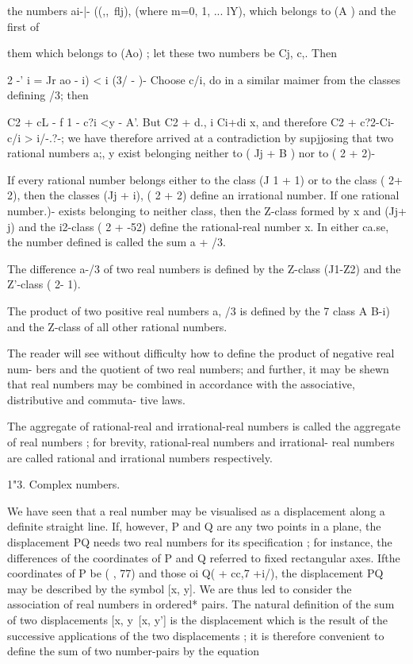 the numbers ai-|-  ((,,\ flj), (where m=0, 1, ... lY), which belongs to (A ) and the first of 

them which belongs to (Ao) ; let these two numbers be Cj, c,. Then 

 2 -' i = Jr  ao -  i) < i (3/ -  )- 
Choose c/i, do in a similar maimer from the classes defining /3; then 

C2 + cL - f 1 - c?i <y - A'. 
But C2 + d., i  Ci+di x, and therefore C2 + c?2-Ci-c/i > i/-.?-; we have therefore 
arrived at a contradiction by supjjosing that two rational numbers a;, y exist belonging 
neither to ( Jj + B ) nor to (  2 +  2)- 

If every rational number belongs either to the class (J 1 +  1) or to the class ( 2+ 2), 
then the classes (Jj +  i), ( 2 +  2) define an irrational number. If one rational number.)- 
exists belonging to neither class, then the Z-class formed by x and (Jj+ j) and the 
i2-class ( 2 + -52) define the rational-real number x. In either ca.se, the number defined 
is called the sum a + /3. 

The difference a-/3 of two real numbers is defined by the Z-class (J1-Z2) and the 
Z'-class ( 2- 1). 

The product of two positive real numbers a, /3 is defined by the 7 class  A B-i) 
and the Z-class of all other rational numbers. 

The reader will see without difficulty how to define the product of negative real num- 
bers and the quotient of two real numbers; and further, it may be shewn that real 
numbers may be combined in accordance with the associative, distributive and commuta- 
tive laws. 

The aggregate of rational-real and irrational-real numbers is called the 
aggregate of real numbers ; for brevity, rational-real numbers and irrational- 
real numbers are called rational and irrational numbers respectively. 

1"3. Complex numbers. 

We have seen that a real number may be visualised as a displacement 
along a definite straight line. If, however, P and Q are any two points in a 
plane, the displacement PQ needs two real numbers for its specification ; for 
instance, the differences of the coordinates of P and Q referred to fixed 
rectangular axes. Ifthe coordinates of P be ( , 77) and those oi Q(  + cc,7 +i/), 
the displacement PQ may be described by the symbol [x, y]. We are thus 
led to consider the association of real numbers in ordered* pairs. The natural 
definition of the sum of two displacements [x, y\ [x, y'] is the displacement 
which is the result of the successive applications of the two displacements ; 
it is therefore convenient to define the sum of two number-pairs by the 
equation 

